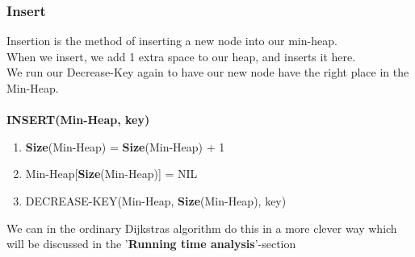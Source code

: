 \documentclass[11pt]{article}
\begin{document}
\subsubsection{Insert}
Insertion is the method of inserting a new node into our min-heap.\\
When we insert, we add 1 extra space to our heap, and inserts it here.\\
We run our Decrease-Key again to have our new node have the right place in the Min-Heap.\\\\
\textbf{INSERT(Min-Heap, key)}
\begin{enumerate}
\setlength\itemsep{0em}
\item \textbf{Size}(Min-Heap) = \textbf{Size}(Min-Heap) + 1
\item Min-Heap[\textbf{Size}(Min-Heap)] = NIL
\item DECREASE-KEY(Min-Heap, \textbf{Size}(Min-Heap), key)
\end{enumerate}
We can in the ordinary Dijkstras algorithm do this in a more clever way which will be discussed in the '\textbf{Running time analysis}'-section
\end{document}
